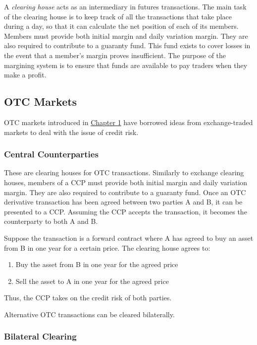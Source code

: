 A \emph{clearing house} acts as an intermediary in futures transactions. The main task of the clearing house is to keep track of all the transactions that take place during a day, so that it can calculate the net position of each of its members. Members must provide both initial margin and daily variation margin. They are also required to contribute to a guaranty fund. This fund exists to cover losses in the event that a member's margin proves insufficient. The purpose of the margining system is to ensure that funds are available to pay
traders when they make a profit.

\subsection{OTC Markets}

OTC markets introduced in \hyperref[sec:1]{Chapter 1} have borrowed ideas from exchange-traded markets to deal with the issue of credit risk.

\subsubsection*{Central Counterparties}

These are clearing houses for OTC transactions. Similarly to exchange clearing houses, members of a CCP must provide both initial margin and daily variation margin. They are also required to contribute to a guaranty fund. Once an OTC derivative transaction has been agreed between two parties A and B, it can be presented to a CCP. Assuming the CCP accepts the transaction, it becomes the
counterparty to both A and B.

\begin{eg}
    Suppose the transaction is a forward contract where A has agreed to buy an asset from B in one year for a certain price. The clearing house agrees to:
    \begin{enumerate}
        \item Buy the asset from B in one year for the agreed price
        \item Sell the asset to A in one year for the agreed price
    \end{enumerate}
\end{eg}

Thus, the CCP takes on the credit risk of both parties.

Alternative OTC transactions can be cleared bilaterally.

\subsubsection*{Bilateral Clearing}

